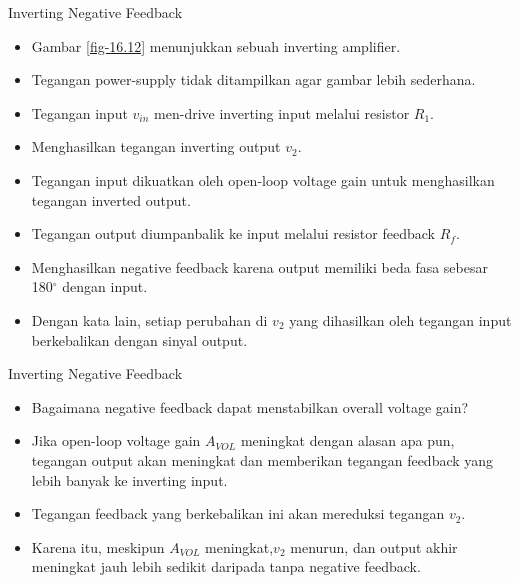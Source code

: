 \begin{frame}{Inverting Negative Feedback}
	\begin{itemize}
		\item Gambar \ref{fig-16.12} menunjukkan sebuah inverting amplifier.
		\item Tegangan power-supply tidak ditampilkan agar gambar lebih sederhana.
		\item Tegangan input $ v_{in} $ men-drive inverting input melalui resistor $ R_1 $.
		\item Menghasilkan tegangan inverting output $ v_2 $.
		\item Tegangan input dikuatkan oleh open-loop voltage gain untuk menghasilkan tegangan inverted output.
		\item Tegangan output diumpanbalik ke input melalui resistor feedback $ R_f $.
		\item Menghasilkan negative feedback karena output memiliki beda fasa sebesar 180$ ^\circ $ dengan input.
		\item Dengan kata lain, setiap perubahan di $ v_2 $ yang dihasilkan oleh tegangan input berkebalikan dengan sinyal output.
	\end{itemize}
\end{frame}

\begin{frame}{Inverting Negative Feedback}
	\begin{itemize}
		\item Bagaimana negative feedback dapat menstabilkan overall voltage gain?
		\item Jika open-loop voltage gain $ A_{VOL} $ meningkat dengan alasan apa pun, tegangan output akan meningkat dan memberikan tegangan feedback yang lebih banyak ke inverting input.
		\item Tegangan feedback yang berkebalikan ini akan mereduksi tegangan $ v_2 $.
		\item Karena itu, meskipun $ A_{VOL} $ meningkat,$ v_2 $ menurun, dan output akhir meningkat jauh lebih sedikit daripada tanpa negative feedback.
	\end{itemize}
\end{frame}

